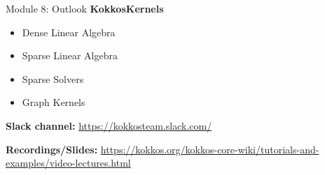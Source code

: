 \begin{frame}{Module 8: Outlook}
  \vspace{5pt}
  \textbf{KokkosKernels}
  \begin{itemize}
    \item Dense Linear Algebra
    \item Sparse Linear Algebra
    \item Sparse Solvers
    \item Graph Kernels
  \end{itemize}

  \vspace{10pt}
  \textbf{Slack channel:} {\scriptsize \url{https://kokkosteam.slack.com/}}

  \vspace{10pt}
  \textbf{Recordings/Slides:} {\scriptsize \url{https://kokkos.org/kokkos-core-wiki/tutorials-and-examples/video-lectures.html}}

\end{frame}






